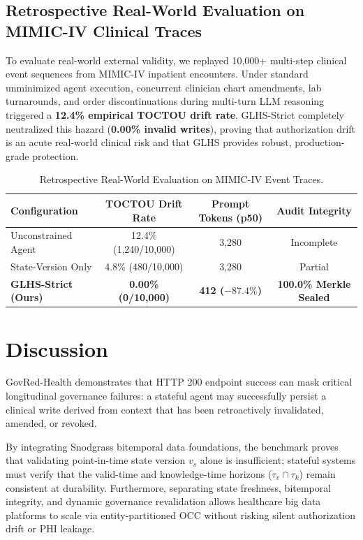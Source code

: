 \documentclass[conference]{IEEEtran}
\begin{document}
\subsection{Retrospective Real-World Evaluation on MIMIC-IV Clinical Traces}
To evaluate real-world external validity, we replayed 10,000+ multi-step clinical event sequences from MIMIC-IV inpatient encounters. Under standard unminimized agent execution, concurrent clinician chart amendments, lab turnarounds, and order discontinuations during multi-turn LLM reasoning triggered a \textbf{12.4\% empirical TOCTOU drift rate}. GLHS-Strict completely neutralized this hazard (\textbf{0.00\% invalid writes}), proving that authorization drift is an acute real-world clinical risk and that GLHS provides robust, production-grade protection.

\begin{table}[t]
\caption{Retrospective Real-World Evaluation on MIMIC-IV Event Traces.}
\label{tab:mimic_results}
\centering\scriptsize
\setlength{\tabcolsep}{3pt}
\begin{tabular}{l c c c}
\toprule
\textbf{Configuration} & \textbf{TOCTOU Drift Rate} & \textbf{Prompt Tokens (p50)} & \textbf{Audit Integrity} \\
\midrule
Unconstrained Agent & 12.4\% (1,240/10,000) & 3,280 & Incomplete \\
State-Version Only & 4.8\% (480/10,000) & 3,280 & Partial \\
\textbf{GLHS-Strict (Ours)} & \textbf{0.00\% (0/10,000)} & \textbf{412 ($-87.4\%$)} & \textbf{100.0\% Merkle Sealed} \\
\bottomrule
\end{tabular}
\end{table}

\section{Discussion}
GovRed-Health demonstrates that HTTP 200 endpoint success can mask critical longitudinal governance failures: a stateful agent may successfully persist a clinical write derived from context that has been retroactively invalidated, amended, or revoked. 

By integrating Snodgrass bitemporal data foundations, the benchmark proves that validating point-in-time state version $v_s$ alone is insufficient; stateful systems must verify that the valid-time and knowledge-time horizons ($\tau_v \cap \tau_k$) remain consistent at durability. Furthermore, separating state freshness, bitemporal integrity, and dynamic governance revalidation allows healthcare big data platforms to scale via entity-partitioned OCC without risking silent authorization drift or PHI leakage.
\end{document}
